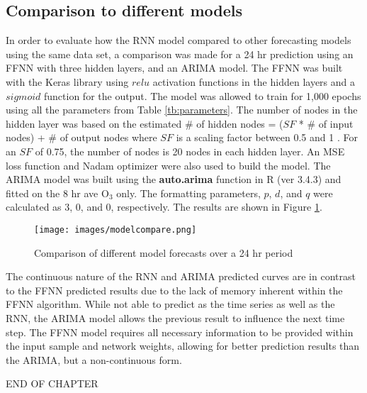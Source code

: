 \subsection{Comparison to different models}

In order to evaluate how the RNN model compared to other forecasting models using the same data set, a comparison was made for a 24 hr prediction using an FFNN with three hidden layers, and an ARIMA model. The FFNN was built with the Keras library using $relu$ activation functions in the hidden layers and a $sigmoid$ function for the output.  The model was allowed to train for 1,000 epochs using all the parameters from Table \ref{tb:parameters}. The number of nodes in the hidden layer was based on the estimated \# of hidden nodes = ($SF$ * \# of input nodes) + \# of output nodes where $SF$ is a scaling factor between 0.5 and 1 \citep{Papaleonidas2013}. For an $SF$ of 0.75, the number of nodes is 20 nodes in each hidden layer. An MSE loss function and Nadam optimizer were also used to build the model. The ARIMA model was built using the \textbf{auto.arima} function in R (ver 3.4.3) \citep{Hyndman2013} and fitted on the 8 hr ave O$_{3}$ only. The formatting parameters, $p$, $d$, and $q$ were calculated as 3, 0, and 0, respectively. The results are shown in Figure \ref{fig:diffmodels}.

%
\begin{figure}[H]
\centering
\texttt{[image: images/modelcompare.png]}
\caption{Comparison of different model forecasts over a 24 hr period}
\label{fig:diffmodels}
\end{figure}
%

The continuous nature of the RNN and ARIMA predicted curves are in contrast to the FFNN predicted results due to the lack of memory inherent within the FFNN algorithm. While not able to predict as the time series as well as the RNN, the ARIMA model allows the previous result to influence the next time step. The FFNN model requires all necessary information to be provided within the input sample and network weights, allowing for better prediction results than the ARIMA, but a non-continuous form. 

\bigskip
\begin{center}
END OF CHAPTER
\end{center}

